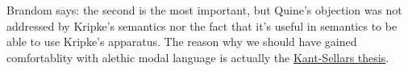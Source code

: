 Brandom says: the second is the most important, but Quine's objection was not addressed by Kripke's semantics nor the fact that it's useful in semantics to be able to use Kripke's apparatus. The reason why we should have gained comfortablity with alethic modal language is actually the \href{doc/phil/People/Brandom/On Sellars/Lectures 2009/Lecture: Counterfactuals and Kant Sellars Thesis/Kant Sellars thesis}{Kant-Sellars thesis}.